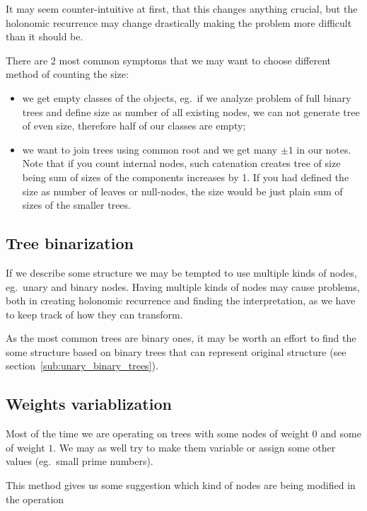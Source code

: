 \documentclass[final]{article}
\theoremstyle{definition}
\theoremstyle{remark}
\begin{document}
It may seem counter-intuitive at first, that this changes anything crucial, but the holonomic recurrence may change drastically making the problem more difficult than it should be.

There are 2 most common symptoms that we may want to choose different method of counting the size:
\begin{itemize}
    \item we get empty classes of the objects, eg.\ if we analyze problem of full binary trees and define size as number of all existing nodes, we can not generate tree of even size, therefore half of our classes are empty;
    \item we want to join trees using common root and we get many \(\pm1\) in our notes. Note that if you count internal nodes, such catenation creates tree of size being sum of sizes of the components increases by 1. If you had defined the size as number of leaves or null-nodes, the size would be just plain sum of sizes of the smaller trees. 
\end{itemize}

\subsection{Tree binarization}%
\label{sub:tree_binarization}

If we describe some structure we may be tempted to use multiple kinds of nodes, eg.~unary and binary nodes. Having multiple kinds of nodes may cause problems, both in creating holonomic recurrence and finding the interpretation, as we have to keep track of how they can transform.

As the most common trees are binary ones, it may be worth an effort to find the some structure based on binary trees that can represent original structure (see section~\ref{sub:unary_binary_trees}).

\subsection{Weights variablization}%
\label{sub:weights_variablization}

Most of the time we are operating on trees with some nodes of weight \(0\) and some of weight \(1\). We may as well try to make them variable or assign some other values (eg.\ small prime numbers).

This method gives us some suggestion which kind of nodes are being modified in the operation
\end{document}
